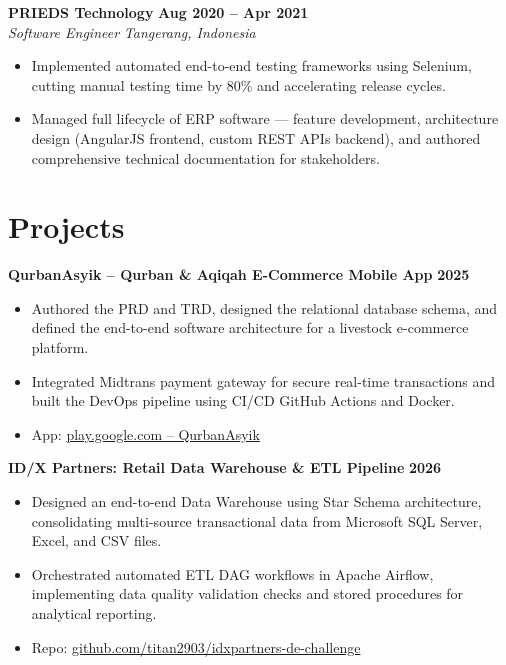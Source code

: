 \documentclass[10pt, letterpaper]{article}
\newcommand{\jobheader}[4]{%
  \noindent\textbf{#1} \hfill \textbf{#2}\\[1pt]
  \textit{#3} \hfill \textit{#4}\\[1.5pt]
}
\newcommand{\plainheader}[2]{%
  \noindent\textbf{#1} \hfill \textbf{#2}\\[1.5pt]
}
\begin{document}
\jobheader{PRIEDS Technology}{Aug 2020 -- Apr 2021}{Software Engineer}{Tangerang, Indonesia}
\begin{itemize}
  \item Implemented automated end-to-end testing frameworks using Selenium, cutting manual testing time by 80\% and accelerating release cycles.
  \item Managed full lifecycle of ERP software — feature development, architecture design (AngularJS frontend, custom REST APIs backend), and authored comprehensive technical documentation for stakeholders.
\end{itemize}

\section{Projects}

\plainheader{QurbanAsyik -- Qurban \& Aqiqah E-Commerce Mobile App}{2025}
\begin{itemize}
  \item Authored the PRD and TRD, designed the relational database schema, and defined the end-to-end software architecture for a livestock e-commerce platform.
  \item Integrated Midtrans payment gateway for secure real-time transactions and built the DevOps pipeline using CI/CD GitHub Actions and Docker.
  \item App: \href{https://play.google.com/store/apps/details?id=com.qurbanasyik.mobile}{play.google.com -- QurbanAsyik}
\end{itemize}
\vspace{2pt}

\plainheader{ID/X Partners: Retail Data Warehouse \& ETL Pipeline}{2026}
\begin{itemize}
  \item Designed an end-to-end Data Warehouse using Star Schema architecture, consolidating multi-source transactional data from Microsoft SQL Server, Excel, and CSV files.
  \item Orchestrated automated ETL DAG workflows in Apache Airflow, implementing data quality validation checks and stored procedures for analytical reporting.
  \item Repo: \href{https://github.com/titan2903/idxpartners-de-challenge}{github.com/titan2903/idxpartners-de-challenge}
\end{itemize}
\vspace{2pt}
\end{document}
